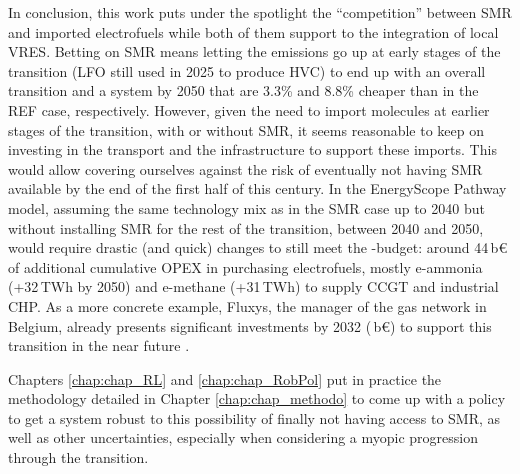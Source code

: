 In conclusion, this work puts under the spotlight the ``competition'' between \gls{SMR} and imported electrofuels while both of them support to the integration of local \gls{VRES}. Betting on \gls{SMR} means letting the emissions go up at early stages of the transition (\ie \gls{LFO} still used in 2025 to produce \gls{HVC}) to end up with an overall transition and a system by 2050 that are 3.3\% and 8.8\% cheaper than in the REF case, respectively. However, given the need to import molecules at earlier stages of the transition, with or without \gls{SMR}, it seems reasonable to keep on investing in the transport and the infrastructure to support these imports. This would allow covering ourselves against the risk of eventually not having \gls{SMR} available by the end of the first half of this century. In the EnergyScope Pathway model, assuming the same technology mix as in the SMR case up to 2040 but without installing \gls{SMR} for the rest of the transition, \ie between 2040 and 2050, would require drastic (and quick) changes to still meet the -budget: around 44\,b€ of additional cumulative OPEX in purchasing electrofuels, mostly e-ammonia (+32\,TWh by 2050) and e-methane (+31\,TWh) to supply \gls{CCGT} and industrial \gls{CHP}. As a more concrete example, Fluxys, the manager of the gas network in Belgium, already presents significant investments by 2032 (\,b€) to support this transition in the near future \cite{Fluxys_2023}. 

Chapters \ref{chap:chap_RL} and \ref{chap:chap_RobPol} put in practice the methodology detailed in Chapter \ref{chap:chap_methodo} to come up with a policy to get a system robust to this possibility of finally not having access to \gls{SMR}, as well as other uncertainties, especially when considering a myopic progression through the transition.